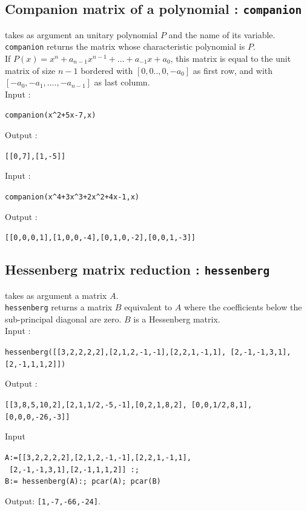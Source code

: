 \documentclass[a4paper,11pt]{book}
\begin{document}
\subsection{Companion matrix of a polynomial : {\tt companion}}\label{sec:compagne}
 takes as argument an unitary polynomial $P$ and the 
name of its variable.\\
{\tt companion} returns the matrix whose characteristic polynomial is $P$.\\
If $P(x)=x^n+a_{n-1}x^{n-1}+...+a_{-1}x+a_0$,
this matrix is equal to the unit matrix of size $n-1$ bordered with
$[0,0..,0,-a_0]$ as first row, and with
$[-a_0,-a_1,....,-a_{n-1}]$ as last column.\\
Input :
\begin{center}{\tt companion(x\verb|^|2+5x-7,x)}\end{center}
Output :
\begin{center}{\tt  [[0,7],[1,-5]]}\end{center}
Input :
\begin{center}{\tt companion(x\verb|^|4+3x\verb|^|3+2x\verb|^|2+4x-1,x)}\end{center}
Output :
\begin{center}{\tt  [[0,0,0,1],[1,0,0,-4],[0,1,0,-2],[0,0,1,-3]]}\end{center}

\subsection{Hessenberg matrix reduction : {\tt hessenberg}}
 takes as argument a matrix $A$.\\
{\tt hessenberg} returns a matrix $B$ equivalent to $A$ where the 
coefficients below the sub-principal diagonal are zero. 
$B$ is a Hessenberg matrix.\\
Input :
\begin{center}{\tt hessenberg([[3,2,2,2,2],[2,1,2,-1,-1],[2,2,1,-1,1], [2,-1,-1,3,1],[2,-1,1,1,2]])}\end{center}
Output :
\begin{center}{\tt  [[3,8,5,10,2],[2,1,1/2,-5,-1],[0,2,1,8,2], [0,0,1/2,8,1],[0,0,0,-26,-3]]}\end{center}
Input 
\begin{center}
{\tt A:=[[3,2,2,2,2],[2,1,2,-1,-1],[2,2,1,-1,1],}\\
{\tt \ [2,-1,-1,3,1],[2,-1,1,1,2]] :;}\\
{\tt B:= hessenberg(A):; pcar(A); pcar(B)
}
\end{center}
Output: {\tt [1,-7,-66,-24]}.
\end{document}
